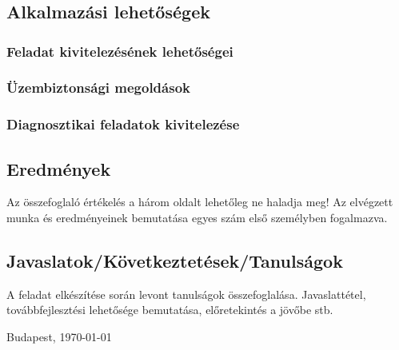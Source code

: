 \chapter{\osszefoglalas} %

\section{Alkalmazási lehetőségek}

\subsection{Feladat kivitelezésének lehetőségei}

\subsection{Üzembiztonsági megoldások}

\subsection{Diagnosztikai feladatok kivitelezése}

\section{Eredmények}
Az összefoglaló értékelés a három oldalt lehetőleg ne haladja meg! 
Az elvégzett munka és eredményeinek bemutatása egyes szám első személyben fogalmazva.


\section{Javaslatok/Következtetések/Tanulságok} %
A feladat elkészítése során levont tanulságok összefoglalása. Javaslattétel, 
továbbfejlesztési lehetősége bemutatása, előretekintés a jövőbe stb.

\vspace{0.5cm}

\begin{flushleft}
{Budapest, \today}
\end{flushleft}

\begin{flushright}
\emph{\authorName}
\end{flushright}

\vfill
